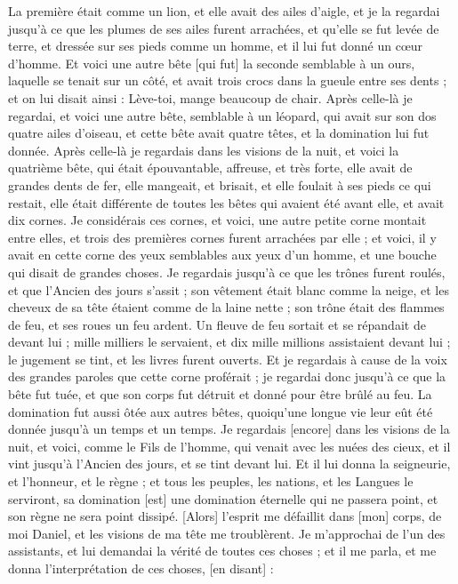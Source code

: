 \begin{multicols}{2}
La première était comme un lion, et elle avait des ailes d'aigle, et je la regardai jusqu'à ce que les plumes de ses ailes furent arrachées, et qu'elle se fut levée de terre, et dressée sur ses pieds comme un homme, et il lui fut donné un cœur d'homme.
Et voici une autre bête [qui fut] la seconde semblable à un ours, laquelle se tenait sur un côté, et avait trois crocs dans la gueule entre ses dents ; et on lui disait ainsi : Lève-toi, mange beaucoup de chair.
Après celle-là je regardai, et voici une autre bête, semblable à un léopard, qui avait sur son dos quatre ailes d'oiseau, et cette bête avait quatre têtes, et la domination lui fut donnée.
Après celle-là je regardais dans les visions de la nuit, et voici la quatrième bête, qui était épouvantable, affreuse, et très forte, elle avait de grandes dents de fer, elle mangeait, et brisait, et elle foulait à ses pieds ce qui restait, elle était différente de toutes les bêtes qui avaient été avant elle, et avait dix cornes.
Je considérais ces cornes, et voici, une autre petite corne montait entre elles, et trois des premières cornes furent arrachées par elle ; et voici, il y avait en cette corne des yeux semblables aux yeux d'un homme, et une bouche qui disait de grandes choses.
Je regardais jusqu'à ce que les trônes furent roulés, et que l'Ancien des jours s'assit ; son vêtement était blanc comme la neige, et les cheveux de sa tête étaient comme de la laine nette ; son trône était des flammes de feu, et ses roues un feu ardent.
Un fleuve de feu sortait et se répandait de devant lui ; mille milliers le servaient, et dix mille millions assistaient devant lui ; le jugement se tint, et les livres furent ouverts.
Et je regardais à cause de la voix des grandes paroles que cette corne proférait ; je regardai donc jusqu'à ce que la bête fut tuée, et que son corps fut détruit et donné pour être brûlé au feu.
La domination fut aussi ôtée aux autres bêtes, quoiqu'une longue vie leur eût été donnée jusqu'à un temps et un temps.
Je regardais [encore] dans les visions de la nuit, et voici, comme le Fils de l'homme, qui venait avec les nuées des cieux, et il vint jusqu'à l'Ancien des jours, et se tint devant lui.
Et il lui donna la seigneurie, et l'honneur, et le règne ; et tous les peuples, les nations, et les Langues le serviront, sa domination [est] une domination éternelle qui ne passera point, et son règne ne sera point dissipé.
[Alors] l'esprit me défaillit dans [mon] corps, de moi Daniel, et les visions de ma tête me troublèrent.
Je m'approchai de l'un des assistants, et lui demandai la vérité de toutes ces choses ; et il me parla, et me donna l'interprétation de ces choses, [en disant] :

\end{multicols}
